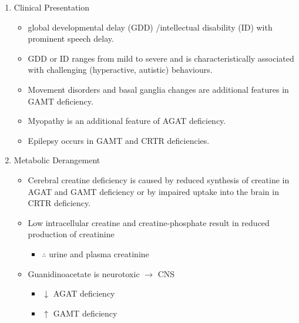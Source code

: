 \documentclass{scrartcl}
\begin{document}
\begin{enumerate}
\item Clinical Presentation
\label{sec:org357001d}
\begin{itemize}
\item global developmental delay (GDD) /intellectual disability (ID) with
prominent speech delay.
\item GDD or ID ranges from mild to severe and is characteristically
associated with challenging (hyperactive, autistic) behaviours.
\item Movement disorders and basal ganglia changes are additional features
in GAMT deficiency.
\item Myopathy is an additional feature of AGAT deficiency.
\item Epilepsy occurs in GAMT and CRTR deficiencies.
\end{itemize}

\item Metabolic Derangement
\label{sec:org87a0e8b}
\begin{itemize}
\item Cerebral  creatine  deficiency is  caused  by  reduced synthesis  of
creatine in AGAT and GAMT deficiency  or by impaired uptake into the
brain in CRTR deficiency.
\item Low intracellular creatine and creatine-phosphate result in reduced
production of creatinine
\begin{itemize}
\item \(\therefore\) \low urine and plasma creatinine
\end{itemize}
\item Guanidinoacetate is neurotoxic \(\to\) CNS
\begin{itemize}
\item \(\downarrow\) AGAT deficiency
\item \(\uparrow\) GAMT deficiency
\end{itemize}
\end{itemize}


\end{enumerate}
\end{document}
